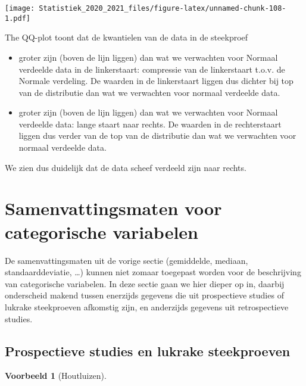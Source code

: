 \documentclass[
  12pt,dutch,coursenotes]{book}
\theoremstyle{definition}
\theoremstyle{definition}
\newtheorem{example}{Voorbeeld}[chapter]
\theoremstyle{definition}
\theoremstyle{remark}
\begin{document}
\texttt{[image: Statistiek\_2020\_2021\_files/figure-latex/unnamed-chunk-108-1.pdf]}

The QQ-plot toont dat de kwantielen van de data in de steekproef

\begin{itemize}
\item
  groter zijn (boven de lijn liggen) dan wat we verwachten voor Normaal verdeelde data in de linkerstaart: compressie van de linkerstaart t.o.v. de Normale verdeling. De waarden in de linkerstaart liggen dus dichter bij top van de distributie dan wat we verwachten voor normaal verdeelde data.
\item
  groter zijn (boven de lijn liggen) dan wat we verwachten voor Normaal verdeelde data: lange staart naar rechts. De waarden in de rechterstaart liggen dus verder van de top van de distributie dan wat we verwachten voor normaal verdeelde data.
\end{itemize}

We zien dus duidelijk dat de data scheef verdeeld zijn naar rechts.

\hypertarget{sec:explCatVar}{%
\section{Samenvattingsmaten voor categorische variabelen}\label{sec:explCatVar}}

De samenvattingsmaten uit de vorige sectie (gemiddelde, mediaan, standaarddeviatie, \ldots) kunnen niet zomaar toegepast worden voor de beschrijving van categorische variabelen. In deze sectie gaan we hier dieper op in, daarbij onderscheid makend tussen enerzijds gegevens die uit prospectieve studies of lukrake steekproeven afkomstig zijn, en anderzijds gegevens uit retrospectieve studies.

\hypertarget{prospectieve-studies-en-lukrake-steekproeven}{%
\subsection{Prospectieve studies en lukrake steekproeven}\label{prospectieve-studies-en-lukrake-steekproeven}}

\begin{example}[Houtluizen]
\protect\hypertarget{exm:unnamed-chunk-109}{}{\label{exm:unnamed-chunk-109} \iffalse (Houtluizen) \fi{} }
\end{example}
\end{document}

